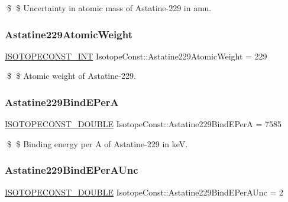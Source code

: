 \$ \$ Uncertainty in atomic mass of Astatine-\/229 in amu. \mbox{\label{group___isotope_const-_astatine-_at229_ga771ce1043b633f8b7dc1098ea69a9061}} 
\subsubsection{\texorpdfstring{Astatine229\+Atomic\+Weight}{Astatine229AtomicWeight}}
{\footnotesize\ttfamily \mbox{\hyperlink{group___isotope_const-_macros_ga5f18360b3e99483a35c32d789e62621c}{I\+S\+O\+T\+O\+P\+E\+C\+O\+N\+S\+T\+\_\+\+I\+NT}} Isotope\+Const\+::\+Astatine229\+Atomic\+Weight = 229}

\$ \$ Atomic weight of Astatine-\/229. \mbox{\label{group___isotope_const-_astatine-_at229_gaba8d4a2b6521b0e2cac7a4dd8c6d62c6}} 
\subsubsection{\texorpdfstring{Astatine229\+Bind\+E\+PerA}{Astatine229BindEPerA}}
{\footnotesize\ttfamily \mbox{\hyperlink{group___isotope_const-_macros_ga8f45a7272ce02c0b4c65c44636ed719a}{I\+S\+O\+T\+O\+P\+E\+C\+O\+N\+S\+T\+\_\+\+D\+O\+U\+B\+LE}} Isotope\+Const\+::\+Astatine229\+Bind\+E\+PerA = 7585}

\$ \$ Binding energy per A of Astatine-\/229 in keV. \mbox{\label{group___isotope_const-_astatine-_at229_gafecaeaac80aa80d11af2cce55eefcc3f}} 
\subsubsection{\texorpdfstring{Astatine229\+Bind\+E\+Per\+A\+Unc}{Astatine229BindEPerAUnc}}
{\footnotesize\ttfamily \mbox{\hyperlink{group___isotope_const-_macros_ga8f45a7272ce02c0b4c65c44636ed719a}{I\+S\+O\+T\+O\+P\+E\+C\+O\+N\+S\+T\+\_\+\+D\+O\+U\+B\+LE}} Isotope\+Const\+::\+Astatine229\+Bind\+E\+Per\+A\+Unc = 2}

